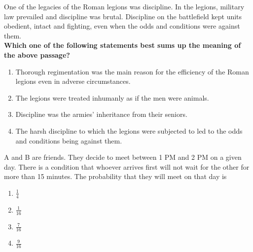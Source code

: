     \item{
            One of the legacies of the Roman legions was discipline. In the legions, military law prevailed
            and discipline was brutal. Discipline on the battlefield kept units obedient, intact and fighting,
            even when the odds and conditions were against them.\\
            \textbf{Which one of the following statements best sums up the meaning of the above passage?}
             \hfill
            
				\begin{enumerate}
					\item	Thorough regimentation was the main reason for the efficiency of the Roman legions even in
					adverse circumstances.
					\item The legions were treated inhumanly as if the men were animals.
					\item Discipline was the armies’ inheritance from their seniors.
					\item The harsh discipline to which the legions were subjected to led to the odds and conditions being
					against them.
				\end{enumerate}
        
        }
    \item{
        
           	A and B are friends. They decide to meet between 1 PM and 2 PM on a given day. There is a
           	condition that whoever arrives first will not wait for the other for more than 15 minutes. The
           	probability that they will meet on that day is
             \text{   }\hfill
                
			
			\begin{multicols}{4}
				\begin{enumerate}
					\item $\frac{1}{4}$
					\item $\frac{1}{16}$
					\item $\frac{7}{16}$
					\item $\frac{9}{16}$
				\end{enumerate}
			\end{multicols}
        
        }
